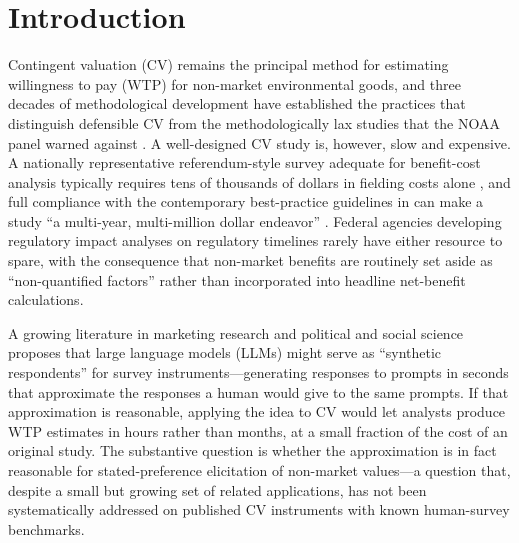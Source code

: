 \documentclass[12pt]{article}
\begin{document}
\section{Introduction}\label{sec:intro}

Contingent valuation (CV) remains the principal method for estimating
willingness to pay (WTP) for non-market environmental goods, and three decades
of methodological development have established the practices that distinguish
defensible CV from the methodologically lax studies that the NOAA panel
warned against \parencite{Arrow1993, Johnston2017}. A well-designed CV study
is, however, slow and expensive. A nationally representative
referendum-style survey adequate for benefit-cost analysis typically requires
tens of thousands of dollars in fielding costs alone \parencite{Champ2017},
and full compliance with the contemporary best-practice guidelines in
\textcite{Johnston2017} can make a study ``a multi-year, multi-million
dollar endeavor'' \parencite{Whitehead2023}. Federal
agencies developing regulatory impact analyses on regulatory timelines
rarely have either resource to spare, with the consequence that non-market
benefits are routinely set aside as ``non-quantified factors'' rather than
incorporated into headline net-benefit calculations.

A growing literature in marketing research \parencite{Brand2024, Li2024} and
political and social science \parencite{Argyle2023, Bisbee2024, Horton2023}
proposes that large language models (LLMs) might serve as
``synthetic respondents'' for survey instruments---generating responses to
prompts in seconds that approximate the responses a human would give to the
same prompts. If that approximation is reasonable, applying the idea to CV
would let analysts produce WTP estimates in hours rather than months, at a
small fraction of the cost of an original study. The substantive question is
whether the approximation is in fact reasonable for stated-preference
elicitation of non-market values---a question that, despite a small but
growing set of related applications, has not been systematically addressed
on published CV instruments with known human-survey benchmarks.
\end{document}
